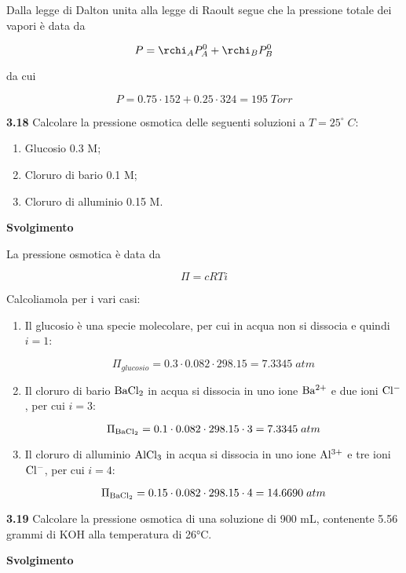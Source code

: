 Dalla legge di Dalton unita alla legge di Raoult segue che la pressione totale dei vapori è data da

$$P=\rchi_A P_A^0 + \rchi_B P_B^0$$

da cui 

$$P=0.75 \cdot 152 + 0.25 \cdot 324=195\;Torr$$

\vspace{0.2cm}\textbf{3.18} Calcolare la pressione osmotica delle seguenti soluzioni a $T=25^{\circ}\;C$:

\begin{enumerate}
    \item Glucosio 0.3 M;
    \item Cloruro di bario 0.1 M;
    \item Cloruro di alluminio 0.15 M.
\end{enumerate}

\vspace{0.2cm}\large\textbf{Svolgimento}\normalsize

\vspace{0.2cm}La pressione osmotica è data da

$$\Pi=cRTi$$

Calcoliamola per i vari casi:

\begin{enumerate}
    \item Il glucosio è una specie molecolare, per cui in acqua non si dissocia e quindi $i=1$:
    
    $$\Pi_{glucosio}=0.3 \cdot 0.082 \cdot 298.15=7.3345\;atm$$

    \item Il cloruro di bario $\rm BaCl_2$ in acqua si dissocia in uno ione $\rm Ba^{2+}$ e due ioni $\rm Cl^-$, per cui $i=3$:
    
    $$\Pi_{\rm BaCl_2}=0.1 \cdot 0.082 \cdot 298.15 \cdot 3=7.3345\;atm$$

    \item Il cloruro di alluminio $\rm AlCl_3$ in acqua si dissocia in uno ione $\rm Al^{3+}$ e tre ioni $\rm Cl^-$, per cui $i=4$:
    
    $$\Pi_{\rm BaCl_2}=0.15 \cdot 0.082 \cdot 298.15 \cdot 4=14.6690\;atm$$
\end{enumerate}

\vspace{0.2cm}\textbf{3.19} Calcolare la pressione osmotica di una soluzione di 900 mL, contenente 5.56 grammi di KOH alla temperatura di 26°C.

\vspace{0.2cm}\large\textbf{Svolgimento}\normalsize

